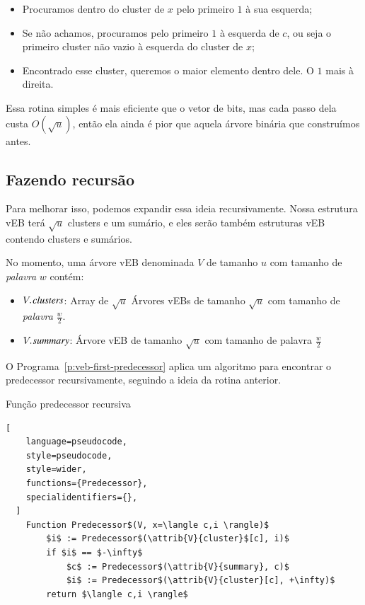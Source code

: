 \begin{itemize}
    \item Procuramos dentro do cluster de $x$ pelo primeiro $1$ à sua esquerda;
    \item Se não achamos, procuramos pelo primeiro $1$ à esquerda de $c$, ou
    seja o primeiro cluster não vazio à esquerda do cluster de $x$; 
    \item Encontrado esse cluster, queremos o maior elemento dentro dele. O $1$
    mais à direita.
\end{itemize}

Essa rotina simples é mais eficiente que o vetor de bits, mas cada passo dela
custa $O(\sqrt{u})$, então ela ainda é pior que aquela árvore binária que
construímos antes. 

\subsection{Fazendo recursão}

Para melhorar isso, podemos expandir essa ideia recursivamente. Nossa estrutura
vEB terá $\sqrt{u}$ clusters e um sumário, e eles serão também estruturas vEB
contendo clusters e sumários.

No momento, uma árvore vEB denominada $V$ de tamanho $u$ com tamanho de
\textit{palavra} $w$ contém:

\begin{itemize}
\item $\attrib{V}{clusters}$: Array de $\sqrt u$ Árvores vEBs de tamanho $\sqrt
u$ com tamanho de \textit{palavra} $\frac{w}{2}$. 
\item $\attrib{V}{summary}$: Árvore vEB de tamanho $\sqrt{u}$ com tamanho de
palavra $\frac{w}{2}$
\end{itemize}

O Programa~\ref{p:veb-first-predecessor} aplica um algoritmo para encontrar o
predecessor recursivamente, seguindo a ideia da rotina anterior.

\begin{programruledcaption}{Função predecessor recursiva\label{p:veb-first-predecessor}}
  \begin{lstlisting}[
    language=pseudocode,
    style=pseudocode,
    style=wider,
    functions={Predecessor},
    specialidentifiers={},
  ]
    Function Predecessor$(V, x=\langle c,i \rangle)$
        $i$ := Predecessor$(\attrib{V}{cluster}$[c], i)$
        if $i$ == $-\infty$
            $c$ := Predecessor$(\attrib{V}{summary}, c)$
            $i$ := Predecessor$(\attrib{V}{cluster}[c], +\infty)$
        return $\langle c,i \rangle$
  \end{lstlisting}
\end{programruledcaption}

